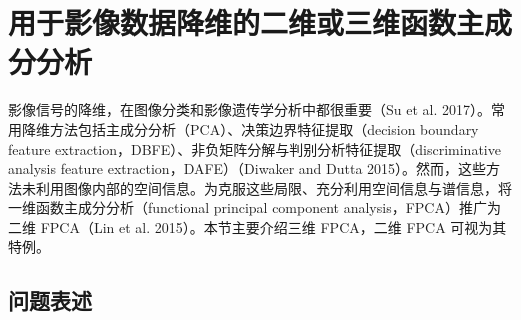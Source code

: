 \section{用于影像数据降维的二维或三维函数主成分分析}

影像信号的降维，在图像分类和影像遗传学分析中都很重要（Su et al. 2017）。常用降维方法包括主成分分析（PCA）、决策边界特征提取（decision boundary feature extraction，DBFE）、非负矩阵分解与判别分析特征提取（discriminative analysis feature extraction，DAFE）（Diwaker and Dutta 2015）。然而，这些方法未利用图像内部的空间信息。为克服这些局限、充分利用空间信息与谱信息，将一维函数主成分分析（functional principal component analysis，FPCA）推广为二维 FPCA（Lin et al. 2015）。本节主要介绍三维 FPCA，二维 FPCA 可视为其特例。

\subsection{问题表述}

